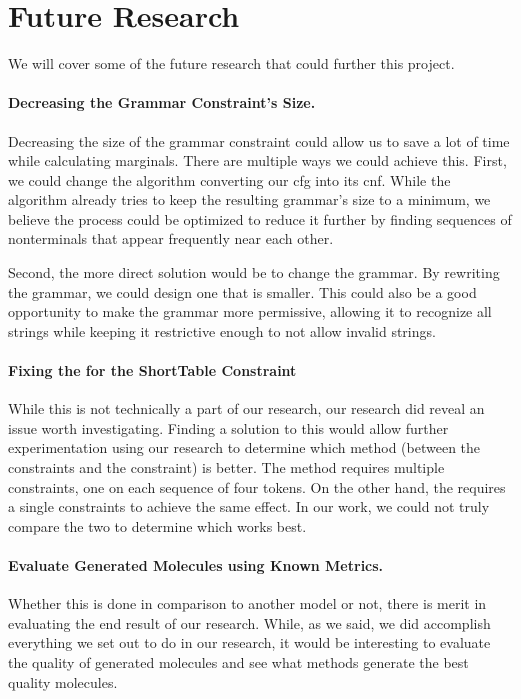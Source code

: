 \documentclass[../Document.tex]{subfiles}
\begin{document}
\section{Future Research}
\label{sec:conc/future}
We will cover some of the future research that could further this project.

\paragraph{Decreasing the Grammar Constraint's Size.}
Decreasing the size of the grammar constraint could allow us to save a lot of time while calculating marginals.
There are multiple ways we could achieve this.
First, we could change the algorithm converting our \gls{cfg} into its \acrlong{cnf}.
While the algorithm already tries to keep the resulting grammar's size to a minimum, we believe the process could be optimized to reduce it further by finding sequences of nonterminals that appear frequently near each other.

Second, the more direct solution would be to change the grammar.
By rewriting the grammar, we could design one that is smaller.
This could also be a good opportunity to make the grammar more permissive, allowing it to recognize all \smiles strings while keeping it restrictive enough to not allow invalid \smiles strings.


\paragraph{Fixing the \bp for the ShortTable Constraint}
While this is not technically a part of our research, our research did reveal an issue worth investigating.
Finding a solution to this would allow further experimentation using our research to determine which method (between the \shortTable constraints and the \costregular constraint) is better.
The \shortTable method requires multiple constraints, one on each sequence of four tokens.
On the other hand, the \costregular requires a single constraints to achieve the same effect.
In our work, we could not truly compare the two to determine which works best.


\paragraph{Evaluate Generated Molecules using Known Metrics.}
Whether this is done in comparison to another model or not, there is merit in evaluating the end result of our research.
While, as we said, we did accomplish everything we set out to do in our research, it would be interesting to evaluate the quality of generated molecules and see what methods generate the best quality molecules.
\end{document}
